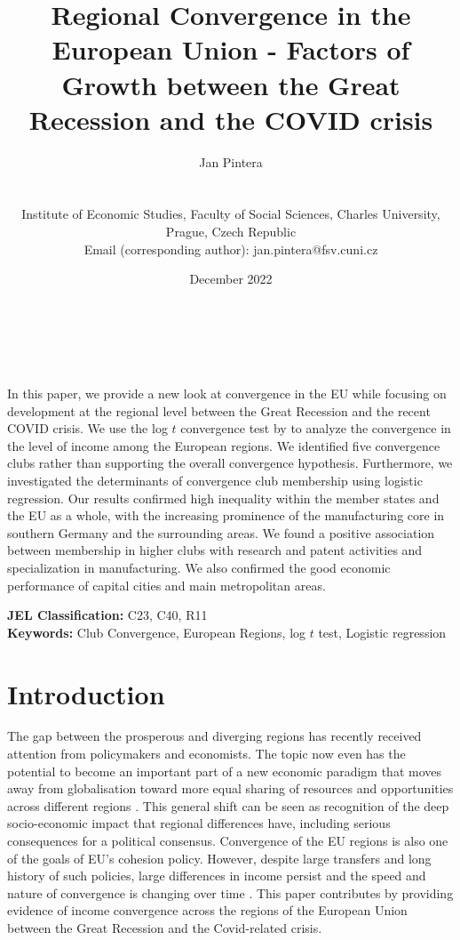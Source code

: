 \documentclass[11pt]{article}
\title{Regional Convergence in the European Union - Factors of Growth between the Great Recession and the COVID crisis}
\author{
        \begin{large}Jan Pintera\end{large} \\\vspace{5mm} \begin{small} Institute of Economic Studies, Faculty of Social Sciences, Charles University,\\ Prague, Czech Republic\\
        Email (corresponding author): jan.pintera@fsv.cuni.cz \end{small}
}
\date{December 2022}
\makeatletter
\renewcommand{\maketitle}{\bgroup\setlength{\parindent}{0pt}
\begin{flushright}
  \textbf{\@title}\\
  \vspace{5mm}
  \@author\\
  \vspace{5mm}
  \@date
\end{flushright}\egroup
}
\renewenvironment{abstract}
 {\small
  \begin{flushleft}
  \bfseries \abstractname\vspace{-.5em}\vspace{0pt}
  \end{flushleft}
  \list{}{%
    \setlength{\leftmargin}{0mm}%
    \setlength{\rightmargin}{\leftmargin}%
  }%
  \item\relax}
 {\endlist}
\def \Keywords {Club Convergence, European Regions, log $t$ test, Logistic regression}
\makeatother
\begin{document}
\maketitle


\thispagestyle{empty}
\begin{abstract}
In this paper, we provide a new look at convergence in the EU while focusing on development at the regional level between the Great Recession and the recent COVID crisis. We use the log $t$ convergence test by \citet{phillips2007transition} to analyze the convergence in the level of income among the European regions. We identified five convergence clubs rather than supporting the overall convergence hypothesis. Furthermore, we investigated the determinants of convergence club membership using logistic regression. Our results confirmed high inequality within the member states and the EU as a whole, with the increasing prominence of the manufacturing core in southern Germany and the surrounding areas. We found a positive association between membership in higher clubs with research and patent activities and specialization in manufacturing. We also confirmed the good economic performance of capital cities and main metropolitan areas.

\bigskip


\textbf{JEL Classification:} C23, C40, R11 \\
\textbf{Keywords:}  \Keywords \\


\end{abstract}
\clearpage
\setcounter{page}{1}

\section{Introduction}
The gap between the prosperous and diverging regions has recently received attention from policymakers and economists. The topic now even has the potential to become an important part of a new economic paradigm that moves away from globalisation toward more equal sharing of resources and opportunities across different regions \citep{rodrik_2022}. This general shift can be seen as recognition of the deep socio-economic impact that regional differences have, including serious consequences for a political consensus. Convergence of the EU regions is also one of the goals of EU's cohesion policy. However, despite large transfers and long history of such policies, large differences in income persist and the speed and nature of convergence is changing over time \citep{eckey2007convergence,zarotiadis2013european, iammarino2019regional}.
This paper contributes by providing evidence of income convergence across the regions of the European Union between the Great Recession and the Covid-related crisis.
\end{document}
